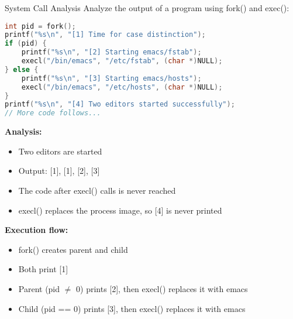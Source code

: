 \begin{example2}{System Call Analysis}
    Analyze the output of a program using fork() and exec():
    
\begin{lstlisting}[language=C, style=basesmol]
int pid = fork();
printf("%s\n", "[1] Time for case distinction");
if (pid) {
    printf("%s\n", "[2] Starting emacs/fstab");
    execl("/bin/emacs", "/etc/fstab", (char *)NULL);
} else {
    printf("%s\n", "[3] Starting emacs/hosts");
    execl("/bin/emacs", "/etc/hosts", (char *)NULL);
}
printf("%s\n", "[4] Two editors started successfully");
// More code follows...
\end{lstlisting}
    
    \tcblower
    
    \textbf{Analysis:}
    \begin{itemize}
        \item Two editors are started
        \item Output: [1], [1], [2], [3]
        \item The code after execl() calls is never reached
        \item execl() replaces the process image, so [4] is never printed
    \end{itemize}
    
    \textbf{Execution flow:}
    \begin{itemize}
        \item fork() creates parent and child
        \item Both print [1]
        \item Parent (pid $\neq$ 0) prints [2], then execl() replaces it with emacs
        \item Child (pid == 0) prints [3], then execl() replaces it with emacs
    \end{itemize}
\end{example2}

